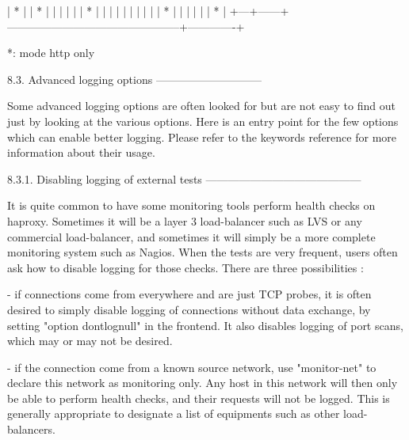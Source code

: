   | * | %
  | * | %
  |   | %
  |   | %
  | * | %
  |   | %
  |   | %
  |   | %
  |   | %
  | * | %
  |   | %
  |   | %
  | * | %
  +---+------+-----------------------------------------------+-------------+

*: mode http only

8.3. Advanced logging options
-----------------------------

Some advanced logging options are often looked for but are not easy to find out
just by looking at the various options. Here is an entry point for the few
options which can enable better logging. Please refer to the keywords reference
for more information about their usage.


8.3.1. Disabling logging of external tests
------------------------------------------

It is quite common to have some monitoring tools perform health checks on
haproxy. Sometimes it will be a layer 3 load-balancer such as LVS or any
commercial load-balancer, and sometimes it will simply be a more complete
monitoring system such as Nagios. When the tests are very frequent, users often
ask how to disable logging for those checks. There are three possibilities :

  - if connections come from everywhere and are just TCP probes, it is often
    desired to simply disable logging of connections without data exchange, by
    setting "option dontlognull" in the frontend. It also disables logging of
    port scans, which may or may not be desired.

  - if the connection come from a known source network, use "monitor-net" to
    declare this network as monitoring only. Any host in this network will then
    only be able to perform health checks, and their requests will not be
    logged. This is generally appropriate to designate a list of equipments
    such as other load-balancers.

